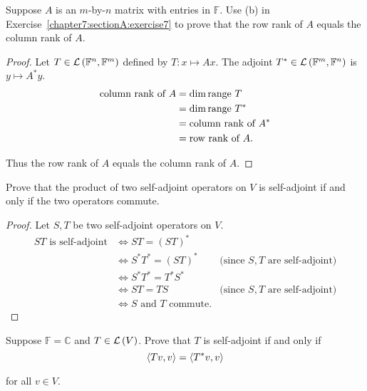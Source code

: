 \begin{exercise}
    Suppose $A$ is an $m$-by-$n$ matrix with entries in $\mathbb{F}$. Use (b) in Exercise~\ref{chapter7:sectionA:exercise7} to prove that the row rank of $A$ equals the column rank of $A$.
\end{exercise}

\begin{proof}
    Let $T\in \mathcal{L}\left({\mathbb{F}^{n}, \mathbb{F}^{m}}\right)$ defined by $T: x\mapsto Ax$. The adjoint $T^{*}\in \mathcal{L}\left({\mathbb{F}^{m}, \mathbb{F}^{n}}\right)$ is $y\mapsto A^{*}y$.
    \begin{align*}
        \text{column rank of $A$} & = \dim\operatorname{range}\,{T} \\
                                  & = \dim\operatorname{range}\,{T^{*}} \\
                                  & = \text{column rank of $A^{*}$} \\
                                  & = \text{row rank of $A$}.
    \end{align*}

    Thus the row rank of $A$ equals the column rank of $A$.
\end{proof}
\newpage

\begin{exercise}
    Prove that the product of two self-adjoint operators on $V$ is self-adjoint if and only if the two operators commute.
\end{exercise}

\begin{proof}
    Let $S, T$ be two self-adjoint operators on $V$.
    \begin{align*}
        \text{$ST$ is self-adjoint} & \Longleftrightarrow ST = {(ST)}^{*} \\
                                    & \Longleftrightarrow S^{*}T^{*} = {(ST)}^{*} & \text{(since $S, T$ are self-adjoint)} \\
                                    & \Longleftrightarrow S^{*}T^{*} = T^{*}S^{*} \\
                                    & \Longleftrightarrow ST = TS & \text{(since $S, T$ are self-adjoint)}        \\
                                    & \Longleftrightarrow \text{$S$ and $T$ commute.}
    \end{align*}
\end{proof}
\newpage

\begin{exercise}
    Suppose $\mathbb{F} = \mathbb{C}$ and $T \in \mathcal{L}\left({V}\right)$. Prove that $T$ is self-adjoint if and only if
    \[
        \left\langle{Tv, v}\right\rangle = \left\langle{T^{*}v, v}\right\rangle
    \]

    for all $v\in V$.
\end{exercise}

